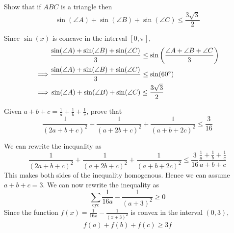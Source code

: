 \begin{problem}
    Show that if $ABC$ is a triangle then 
    \[
        \sin(\angle A) + \sin(\angle B) + \sin(\angle C) \leq \frac{3\sqrt{3}}{2}
    \]
\end{problem}
\begin{sol}
    Since $\sin(x)$ is concave in the interval $[0, \pi]$, 
    \begin{align*}
        & \frac{\sin(\angle A) + \sin(\angle B) + \sin(\angle C)}{3} \leq 
        \sin\left( \frac{\angle A + \angle B + \angle C}{3} \right) \\
         \implies &\frac{\sin(\angle A) + \sin(\angle B) + \sin(\angle C)}{3} \leq 
        \sin(60^\circ) \\
         \implies &\sin(\angle A) + \sin(\angle B) + \sin(\angle C) \leq 
        \frac{3\sqrt{3}}{2}
    \end{align*}
\end{sol}

\begin{problem}
    Given $a+b+c = \frac{1}{a}+\frac{1}{b}+\frac{1}{c}$, prove that 
    \[
        \frac{1}{(2a + b + c)^{2}} +
        \frac{1}{(a + 2b + c)^{2}} + 
        \frac{1}{(a + b + 2c)^{2}} \leq \frac{3}{16}
    \]
\end{problem}
\begin{sol}
   We can rewrite the inequality as 
    \[
        \frac{1}{(2a + b + c)^{2}} +
        \frac{1}{(a + 2b + c)^{2}} + 
        \frac{1}{(a + b + 2c)^{2}} \leq \frac{3}{16}\frac{\frac{1}{a} + \frac{1}{b} + \frac{1}{c}}{a + b + c}
    \]
    This makes both sides of the inequality homogenous. Hence we can assume $a + b + c = 3$. 
    We can now rewrite the inequality as 
    \[
        \sum_{\mathrm{cyc}} \frac{1}{16a} - \frac{1}{(a + 3)^{2}} \geq 0
    \]
    Since the function $f(x) = \frac{1}{16x} - \frac{1}{(x + 3)^{2}}$ is convex in the interval $(0, 3)$, 
    \begin{align*}
        f(a) + f(b) + f(c) \geq 3f
    \end{align*}
\end{sol}

